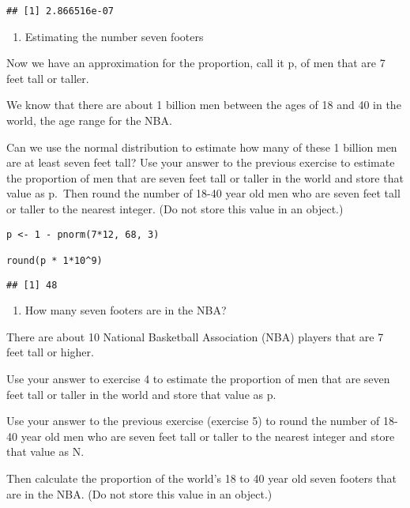 \documentclass[]{article}
\providecommand{\tightlist}{%
  \setlength{\itemsep}{0pt}\setlength{\parskip}{0pt}}
\begin{document}
\begin{verbatim}
## [1] 2.866516e-07
\end{verbatim}

\begin{enumerate}
\def\labelenumi{\arabic{enumi}.}
\setcounter{enumi}{4}
\tightlist
\item
  Estimating the number seven footers
\end{enumerate}

Now we have an approximation for the proportion, call it p, of men that
are 7 feet tall or taller.

We know that there are about 1 billion men between the ages of 18 and 40
in the world, the age range for the NBA.

Can we use the normal distribution to estimate how many of these 1
billion men are at least seven feet tall? Use your answer to the
previous exercise to estimate the proportion of men that are seven feet
tall or taller in the world and store that value as p.~Then round the
number of 18-40 year old men who are seven feet tall or taller to the
nearest integer. (Do not store this value in an object.)

\begin{verbatim}
p <- 1 - pnorm(7*12, 68, 3)

round(p * 1*10^9)
\end{verbatim}

\begin{verbatim}
## [1] 48
\end{verbatim}

\begin{enumerate}
\def\labelenumi{\arabic{enumi}.}
\setcounter{enumi}{5}
\tightlist
\item
  How many seven footers are in the NBA?
\end{enumerate}

There are about 10 National Basketball Association (NBA) players that
are 7 feet tall or higher.

Use your answer to exercise 4 to estimate the proportion of men that are
seven feet tall or taller in the world and store that value as p.

Use your answer to the previous exercise (exercise 5) to round the
number of 18-40 year old men who are seven feet tall or taller to the
nearest integer and store that value as N.

Then calculate the proportion of the world's 18 to 40 year old seven
footers that are in the NBA. (Do not store this value in an object.)
\end{document}
